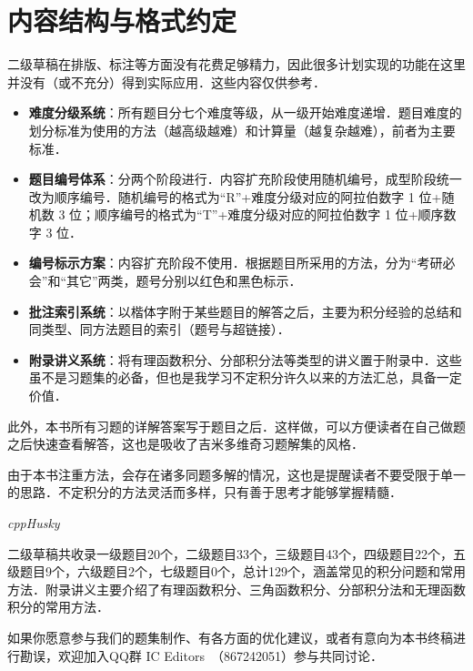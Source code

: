 \documentclass{ctexbook}
\begin{document}
\section*{内容结构与格式约定}
二级草稿在排版、标注等方面没有花费足够精力，因此很多计划实现的功能在这里并没有（或不充分）得到实际应用．这些内容仅供参考．\par
\begin{itemize}
	\item\textbf{难度分级系统}：所有题目分七个难度等级，从一级开始难度递增．题目难度的划分标准为使用的方法（越高级越难）和计算量（越复杂越难），前者为主要标准．\par
	\item\textbf{题目编号体系}：分两个阶段进行．内容扩充阶段使用随机编号，成型阶段统一改为顺序编号．随机编号的格式为“R”+难度分级对应的阿拉伯数字 1 位+随机数 3 位；顺序编号的格式为“T”+难度分级对应的阿拉伯数字 1 位+顺序数字 3 位．\par
	\item\textbf{编号标示方案}：内容扩充阶段不使用．根据题目所采用的方法，分为“考研必会”和“其它”两类，题号分别以红色和黑色标示．
	\item\textbf{批注索引系统}：以楷体字附于某些题目的解答之后，主要为积分经验的总结和同类型、同方法题目的索引（题号与超链接）．\par
	\item\textbf{附录讲义系统}：将有理函数积分、分部积分法等类型的讲义置于附录中．这些虽不是习题集的必备，但也是我学习不定积分许久以来的方法汇总，具备一定价值．\par
\end{itemize}\par
此外，本书所有习题的详解答案写于题目之后．这样做，可以方便读者在自己做题之后快速查看解答，这也是吸收了吉米多维奇习题解集的风格．\par
由于本书注重方法，会存在诸多同题多解的情况，这也是提醒读者不要受限于单一的思路．不定积分的方法灵活而多样，只有善于思考才能够掌握精髓．\par
\begin{flushright}\textit{cppHusky}\end{flushright}\par
{\kaishu 二级草稿共收录一级题目20个，二级题目33个，三级题目43个，四级题目22个，五级题目9个，六级题目2个，七级题目0个，总计129个，涵盖常见的积分问题和常用方法．附录讲义主要介绍了有理函数积分、三角函数积分、分部积分法和无理函数积分的常用方法．\par
如果你愿意参与我们的题集制作、有各方面的优化建议，或者有意向为本书终稿进行勘误，欢迎加入QQ群 IC Editors\ （867242051）参与共同讨论．}\par
\mainmatter
\end{document}
